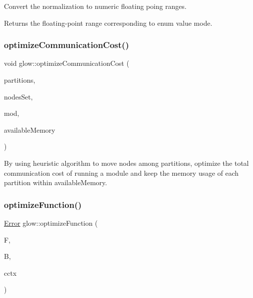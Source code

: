Convert the normalization to numeric floating poing ranges. 

\begin{DoxyReturn}{Returns}
the floating-\/point range corresponding to enum value {\ttfamily mode}. 
\end{DoxyReturn}
\mbox{\label{namespaceglow_a07bee061556f83b0349d96ad196f0faf}} 
\subsubsection{\texorpdfstring{optimize\+Communication\+Cost()}{optimizeCommunicationCost()}}
{\footnotesize\ttfamily void glow\+::optimize\+Communication\+Cost (\begin{DoxyParamCaption}\item[{\hyperlink{classglow_1_1_node_to_function_map}{Node\+To\+Function\+Map} \&}]{partitions,  }\item[{Function\+To\+Nodes\+Map \&}]{nodes\+Set,  }\item[{\hyperlink{classglow_1_1_module}{Module} $\ast$}]{mod,  }\item[{uint64\+\_\+t}]{available\+Memory }\end{DoxyParamCaption})}

By using heuristic algorithm to move nodes among {\ttfamily partitions}, optimize the total communication cost of running a module and keep the memory usage of each partition within {\ttfamily available\+Memory}. \mbox{\label{namespaceglow_af6b48e8310d02c29962b5469885b3a75}} 
\subsubsection{\texorpdfstring{optimize\+Function()}{optimizeFunction()}}
{\footnotesize\ttfamily \hyperlink{namespaceglow_afdb176c3a672ef66db0ecfc19a8d39bf}{Error} glow\+::optimize\+Function (\begin{DoxyParamCaption}\item[{\hyperlink{classglow_1_1_function}{Function} $\ast$}]{F,  }\item[{const \hyperlink{classglow_1_1_backend}{Backend} \&}]{B,  }\item[{\hyperlink{structglow_1_1_compilation_context}{Compilation\+Context} \&}]{cctx }\end{DoxyParamCaption})}

